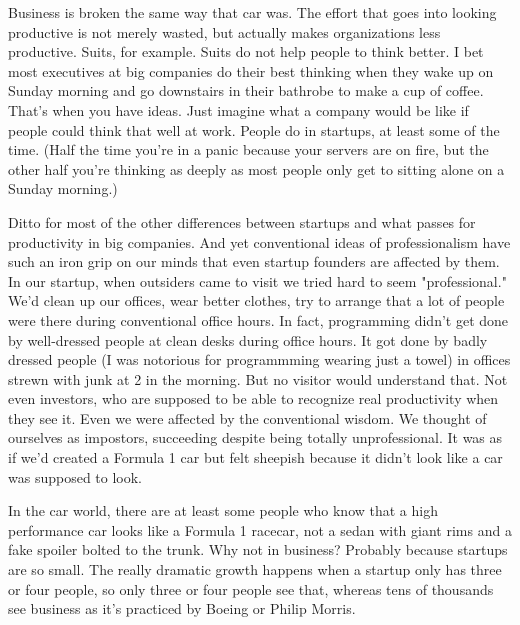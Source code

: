 Business is broken the same way
                  that car was. The effort that goes into looking productive is
                  not merely wasted, but actually makes organizations less
                  productive. Suits, for example. Suits do not help people to
                  think better. I bet most executives at big companies do their
                  best thinking when they wake up on Sunday morning and go
                  downstairs in their bathrobe to make a cup of coffee. That's
                  when you have ideas. Just imagine what a company would be like
                  if people could think that well at work. People do in
                  startups, at least some of the time. (Half the time you're in
                  a panic because your servers are on fire, but the other half
                  you're thinking as deeply as most people only get to sitting
                  alone on a Sunday morning.)

Ditto for most of the
                  other differences between startups and what passes for
                  productivity in big companies. And yet conventional ideas of
                  professionalism have such an iron grip on our minds that even
                  startup founders are affected by them. In our startup, when
                  outsiders came to visit we tried hard to seem "professional."
                  We'd clean up our offices, wear better clothes, try to arrange
                  that a lot of people were there during conventional office
                  hours. In fact, programming didn't get done by well-dressed
                  people at clean desks during office hours. It got done by
                  badly dressed people (I was notorious for programmming wearing
                  just a towel) in offices strewn with junk at 2 in the morning.
                  But no visitor would understand that. Not even investors, who
                  are supposed to be able to recognize real productivity when
                  they see it. Even we were affected by the conventional wisdom.
                  We thought of ourselves as impostors, succeeding despite being
                  totally unprofessional. It was as if we'd created a Formula 1
                  car but felt sheepish because it didn't look like a car was
                  supposed to look.

In the car world, there are at
                  least some people who know that a high performance car looks
                  like a Formula 1 racecar, not a sedan with giant rims and a
                  fake spoiler bolted to the trunk. Why not in business?
                  Probably because startups are so small. The really dramatic
                  growth happens when a startup only has three or four people,
                  so only three or four people see that, whereas tens of
                  thousands see business as it's practiced by Boeing or Philip
                  Morris.

